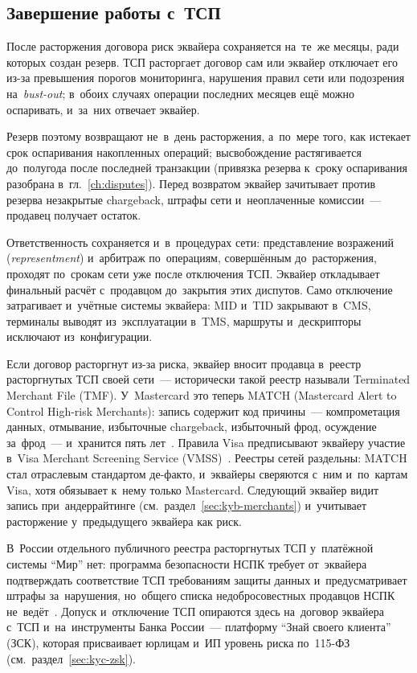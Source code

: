 \subsection*{Завершение работы с~ТСП}

После расторжения договора риск эквайера сохраняется на~те~же месяцы, ради
которых создан резерв. ТСП расторгает договор сам или эквайер отключает его
из-за превышения порогов мониторинга, нарушения правил сети или подозрения
на~\textit{bust-out}; в~обоих случаях операции последних месяцев ещё можно
оспаривать, и~за~них отвечает эквайер.

Резерв поэтому возвращают не~в~день расторжения, а~по~мере того, как
истекает срок оспаривания накопленных операций; высвобождение растягивается
до~полугода после последней транзакции (привязка резерва к~сроку
оспаривания разобрана в~гл.~\ref{ch:disputes}). Перед возвратом эквайер
зачитывает против резерва незакрытые chargeback, штрафы сети и~неоплаченные
комиссии~--- продавец получает остаток.

Ответственность сохраняется и~в~процедурах сети: представление возражений
(\textit{representment}) и~арбитраж по~операциям, совершённым до~расторжения,
проходят по~срокам сети уже после отключения ТСП. Эквайер откладывает
финальный расчёт с~продавцом до~закрытия этих диспутов. Само отключение
затрагивает и~учётные системы эквайера: MID и~TID закрывают в~CMS, терминалы выводят из~эксплуатации в~TMS, маршруты и~дескрипторы исключают из~конфигурации.

Если договор расторгнут из-за риска, эквайер вносит продавца в~реестр
расторгнутых ТСП своей сети~--- исторически такой реестр называли Terminated
Merchant File (TMF). У~Mastercard это теперь MATCH (Mastercard Alert to
Control High-risk Merchants): запись содержит код причины~--- компрометация
данных, отмывание, избыточные chargeback, избыточный фрод, осуждение
за~фрод~--- и~хранится пять лет~\cite{mc-spme-2025}. Правила Visa
предписывают эквайеру участие в~Visa Merchant Screening Service
(VMSS)~\cite{visa-merchant-screening-service}. Реестры сетей раздельны: MATCH
стал отраслевым стандартом де-факто, и~эквайеры сверяются с~ним и~по~картам
Visa, хотя обязывает к~нему только Mastercard. Следующий эквайер видит запись
при~андеррайтинге (см.~раздел~\ref{sec:kyb-merchants}) и~учитывает расторжение
у~предыдущего эквайера как риск.

В~России отдельного публичного реестра расторгнутых ТСП у~платёжной системы
\enquote{Мир} нет: программа безопасности НСПК требует от~эквайера подтверждать
соответствие ТСП требованиям защиты данных и~предусматривает штрафы
за~нарушения, но~общего списка недобросовестных продавцов НСПК
не~ведёт~\cite{nspk-mir-security}. Допуск и~отключение ТСП опираются здесь
на~договор эквайера с~ТСП и~на~инструменты Банка России~--- платформу
\enquote{Знай своего клиента} (ЗСК), которая присваивает юрлицам и~ИП уровень
риска по~115-ФЗ (см.~раздел~\ref{sec:kyc-zsk}).

